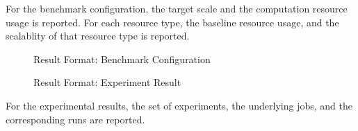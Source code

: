 For the benchmark configuration, the target scale and the computation resource usage is reported. For each resource type, the baseline resource usage, and the scalablity of that resource type is reported.

\begin{figure}[!h]
	\centering
	\caption{Result Format: Benchmark Configuration}
	\label{fig:result-format:conf}
\end{figure}

\begin{figure}[!h]
	\centering
	\caption{Result Format: Experiment Result}
	\label{fig:result-format:result}
\end{figure}

For the experimental results, the set of experiments, the underlying jobs, and the corresponding runs are reported.
